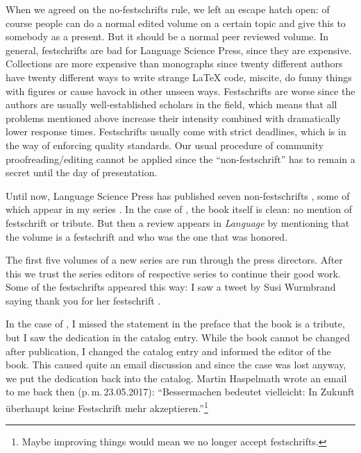 \documentclass[output=paper,colorlinks,citecolor=brown]{langscibook}
\begin{document}
When we agreed on the no-festschrifts rule, we left an escape hatch open: of course people can do a
normal edited volume on a certain topic and give this to somebody as a present. But it should be a
normal peer reviewed volume. In general, festschrifts are bad for Language Science Press, since they are
expensive. Collections are more expensive than monographs since twenty different authors have twenty
different ways to write strange \LaTeX{} code, miscite, do funny things with figures or cause havock
in other unseen ways. Festschrifts are worse since the authors are usually well-established scholars
in the field, which means that all problems mentioned above increase their intensity combined with
dramatically lower response times. Festschrifts usually come with strict deadlines, which is in the
way of enforcing quality standards. Our usual procedure of community proofreading/editing cannot be
applied since the ``non-festschrift'' has to remain a secret until the day of presentation. 

Until now, Language Science Press has published seven non-festschrifts \citep{BS2017a-ed,BBDV2020a-ed,LS2021a-ed,MS2022a-ed,BHZ2017a-ed,BBDGN2018a-ed}, some of which appear
in my series \citep{BHZ2017a-ed,BBDGN2018a-ed}.
%
% 
% 
% 
%
%
%
%
%
In the case of , the book itself is clean: no mention of festschrift or
tribute. But then a review appears in \emph{Language} by \citet{Bauer2020a-u} mentioning that the
volume is a festschrift and who was the one that was honored. 

The first five volumes of a new series are run through the press directors. After this we trust the
series editors of respective series to continue their good work. Some of the festschrifts appeared
this way: I saw a tweet by Susi Wurmbrand saying thank you for her festschrift \citep{LS2021a-ed}.


In the case of , I missed the statement in the preface that the book is a tribute,
but I saw the dedication in the catalog entry. While the book cannot be changed after publication, I
changed the catalog entry and informed the editor of the book. This caused quite an email
discussion and since the case was lost anyway, we put the dedication back into the catalog. 
Martin Haspelmath wrote an email to me back then
(p.\,m.\,23.05.2017): ``Bessermachen bedeutet viel\-leicht: In Zukunft überhaupt keine Festschrift mehr
akzeptieren.''\footnote{
Maybe improving things would mean we no longer accept festschrifts.
}
\end{document}
